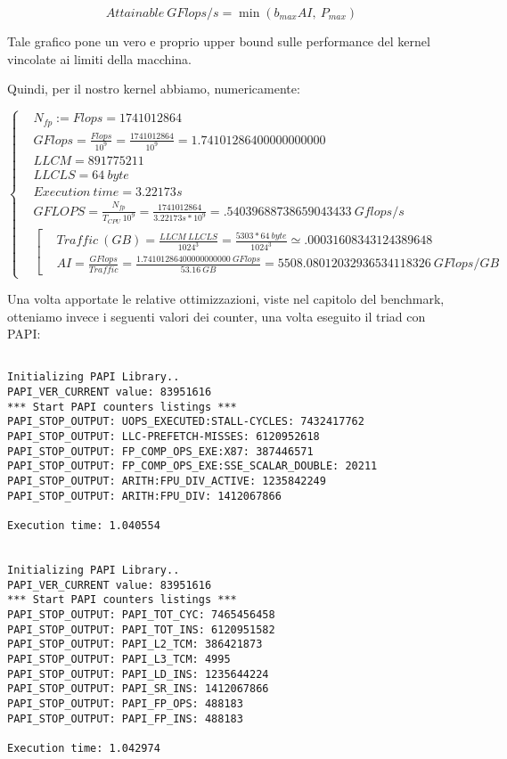 \[
	Attainable\ GFlops/s = \min(b_{max}AI,\ P_{max})
\]

Tale grafico pone un vero e proprio upper bound sulle performance del kernel vincolate ai limiti della macchina.

Quindi, per il nostro kernel abbiamo, numericamente:

\[
	\left\{
	\begin{aligned}
	&N_{fp} := Flops = 1741012864\\
	&GFlops = \frac{Flops}{10^9} = \frac{1741012864}{10^9} = 1.74101286400000000000\\
	&LLCM = 891775211\\
	&LLCLS = 64\ byte\\
	&Execution\ time = 3.22173s\\
	&GFLOPS = \frac{N_{fp}}{T_{CPU}\ 10^9} = \frac{1741012864}{3.22173s*10^9} = .54039688738659043433\ Gflops/s\\
	&\left[
	\begin{aligned}
	&Traffic\ (GB) = \frac{LLCM\ LLCLS}{1024^3} = \frac{5303*64\ byte}{1024^3} \simeq .00031608343124389648\\
	&AI = \frac{GFlops}{Traffic} = \frac{1.74101286400000000000\ GFlops}{53.16\ GB} = 5508.08012032936534118326\ GFlops/GB
	\end{aligned}
	\right.
	\end{aligned}
	\right.
\]

Una volta apportate le relative ottimizzazioni, viste nel capitolo del benchmark, otteniamo invece i seguenti valori dei counter, una volta eseguito il triad con PAPI:

\begin{lstlisting}

Initializing PAPI Library..
PAPI_VER_CURRENT value: 83951616
*** Start PAPI counters listings ***
PAPI_STOP_OUTPUT: UOPS_EXECUTED:STALL-CYCLES: 7432417762
PAPI_STOP_OUTPUT: LLC-PREFETCH-MISSES: 6120952618
PAPI_STOP_OUTPUT: FP_COMP_OPS_EXE:X87: 387446571
PAPI_STOP_OUTPUT: FP_COMP_OPS_EXE:SSE_SCALAR_DOUBLE: 20211
PAPI_STOP_OUTPUT: ARITH:FPU_DIV_ACTIVE: 1235842249
PAPI_STOP_OUTPUT: ARITH:FPU_DIV: 1412067866

Execution time: 1.040554


Initializing PAPI Library..
PAPI_VER_CURRENT value: 83951616
*** Start PAPI counters listings ***
PAPI_STOP_OUTPUT: PAPI_TOT_CYC: 7465456458
PAPI_STOP_OUTPUT: PAPI_TOT_INS: 6120951582
PAPI_STOP_OUTPUT: PAPI_L2_TCM: 386421873
PAPI_STOP_OUTPUT: PAPI_L3_TCM: 4995
PAPI_STOP_OUTPUT: PAPI_LD_INS: 1235644224
PAPI_STOP_OUTPUT: PAPI_SR_INS: 1412067866
PAPI_STOP_OUTPUT: PAPI_FP_OPS: 488183
PAPI_STOP_OUTPUT: PAPI_FP_INS: 488183

Execution time: 1.042974


\end{lstlisting}

